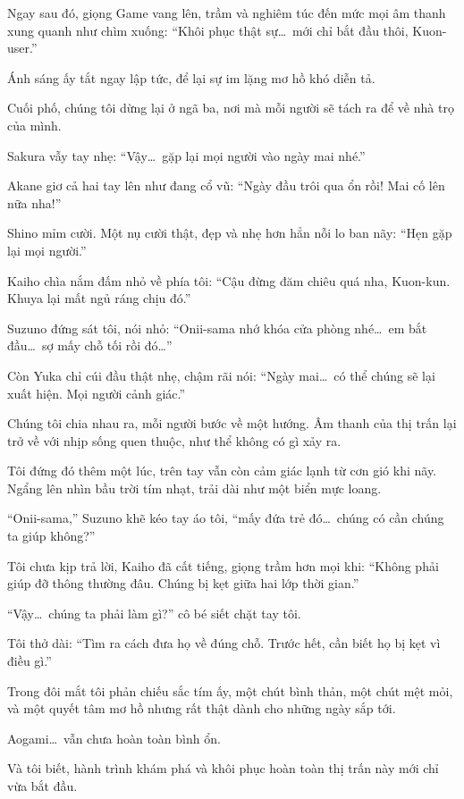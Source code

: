 \documentclass[../main.tex]{subfiles}
\begin{document}
Ngay sau đó, giọng Game vang lên, trầm và nghiêm túc đến mức mọi âm thanh xung quanh như chìm xuống: ``Khôi phục thật sự\dots\ mới chỉ bắt đầu thôi, Kuon-user.''

Ánh sáng ấy tắt ngay lập tức, để lại sự im lặng mơ hồ khó diễn tả.

Cuối phố, chúng tôi dừng lại ở ngã ba, nơi mà mỗi người sẽ tách ra để về nhà trọ của mình.

Sakura vẫy tay nhẹ: ``Vậy\dots\ gặp lại mọi người vào ngày mai nhé.''

Akane giơ cả hai tay lên như đang cổ vũ: ``Ngày đầu trôi qua ổn rồi! Mai cố lên nữa nha!''

Shino mỉm cười. Một nụ cười thật, đẹp và nhẹ hơn hẳn nỗi lo ban nãy: ``Hẹn gặp lại mọi người.''

Kaiho chìa nắm đấm nhỏ về phía tôi: ``Cậu đừng đăm chiêu quá nha, Kuon-kun. Khuya lại mất ngủ ráng chịu đó.''

Suzuno đứng sát tôi, nói nhỏ: ``Onii-sama nhớ khóa cửa phòng nhé\dots\ em bắt đầu\dots\ sợ mấy chỗ tối rồi đó\dots''

Còn Yuka chỉ cúi đầu thật nhẹ, chậm rãi nói: ``Ngày mai\dots\ có thể chúng sẽ lại xuất hiện. Mọi người cảnh giác.''

Chúng tôi chia nhau ra, mỗi người bước về một hướng. Âm thanh của thị trấn lại trở về với nhịp sống quen thuộc, như thể không có gì xảy ra.

Tôi đứng đó thêm một lúc, trên tay vẫn còn cảm giác lạnh từ cơn gió khi nãy. Ngẩng lên nhìn bầu trời tím nhạt, trải dài như một biển mực loang.

``Onii-sama,'' Suzuno khẽ kéo tay áo tôi, ``mấy đứa trẻ đó\dots\ chúng có cần chúng ta giúp không?''

Tôi chưa kịp trả lời, Kaiho đã cất tiếng, giọng trầm hơn mọi khi: ``Không phải giúp đỡ thông thường đâu. Chúng bị kẹt giữa hai lớp thời gian.''

``Vậy\dots\ chúng ta phải làm gì?'' cô bé siết chặt tay tôi.

Tôi thở dài: ``Tìm ra cách đưa họ về đúng chỗ. Trước hết, cần biết họ bị kẹt vì điều gì.''

Trong đôi mắt tôi phản chiếu sắc tím ấy, một chút bình thản, một chút mệt mỏi, và một quyết tâm mơ hồ nhưng rất thật dành cho những ngày sắp tới.

Aogami\dots\ vẫn chưa hoàn toàn bình ổn.

Và tôi biết, hành trình khám phá và khôi phục hoàn toàn thị trấn này mới chỉ vừa bắt đầu.
\end{document}
